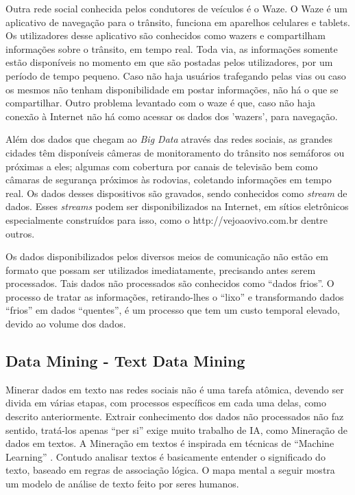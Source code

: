 Outra rede social conhecida pelos condutores de veículos é o Waze. O Waze é um aplicativo de navegação para o trânsito, funciona em aparelhos celulares e tablets. 
Os utilizadores desse aplicativo são conhecidos como wazers e compartilham informações sobre o trânsito, em tempo real. Toda via, as informações somente estão disponíveis 
no momento em que são postadas pelos utilizadores, por um período de tempo pequeno. Caso não haja usuários trafegando pelas vias ou caso os mesmos não tenham disponibilidade 
em postar informações, não há o que se compartilhar.
Outro problema levantado com o waze é que, caso não haja conexão à Internet não há como acessar os dados dos 'wazers', para navegação.

Além dos dados que chegam ao \textit{Big Data} através das redes sociais, as grandes cidades têm disponíveis câmeras de monitoramento do trânsito nos semáforos ou próximas a eles; 
algumas com cobertura por canais de televisão bem como câmaras de segurança próximos às rodovias, coletando informações em tempo real. 
Os dados desses dispositivos são gravados, sendo conhecidos como \textit{stream} de dados. 
Esses \textit{streams} podem ser disponibilizados na Internet, em sítios eletrônicos especialmente construídos para isso, como o http://vejoaovivo.com.br dentre outros.

Os dados disponibilizados pelos diversos meios de comunicação não estão em formato que possam ser utilizados imediatamente, precisando antes serem processados. 
Tais dados não processados são conhecidos como ``dados frios''. O processo de tratar as informações, retirando-lhes o ``lixo'' e transformando dados ``frios'' em dados 
``quentes'', é um processo que tem um custo temporal elevado, devido ao volume dos dados.



\pagebreak
\subsection{Data Mining - Text Data Mining}\label{arte:palavraChave:DataMiningBigData}

Minerar dados em texto nas redes sociais não é uma tarefa atômica, devendo ser divida em várias etapas, com processos específicos em cada uma delas, como descrito anteriormente. 
Extrair conhecimento dos dados não processados não faz sentido, tratá-los apenas ``per si'' exige muito trabalho de IA, como Mineração de dados em textos. 
A Mineração em textos é inspirada em técnicas de ``Machine Learning'' \cite{Aranha2006}. 
Contudo analisar textos é basicamente entender o significado do texto, baseado em regras de associação lógica.
O mapa mental a seguir mostra um modelo de análise de texto feito por seres humanos.

